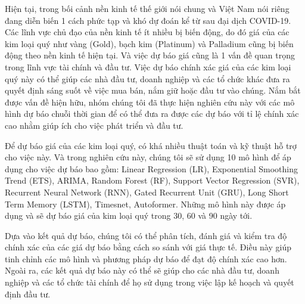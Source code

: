 Hiện tại, trong bối cảnh nền kinh tế thế giới nói chung và Việt Nam nói riêng đang diễn biến 1 cách phức tạp và khó dự đoán kể từ sau đại dịch COVID-19. Các lĩnh vực chủ đạo của nền kinh tế ít nhiều bị biến động, do đó giá của các kim loại quý như vàng (Gold), bạch kim (Platinum) và Palladium cũng bị biến động theo nền kinh tế hiện tại. Và việc dự báo giá cũng là 1 vấn đề quan trọng trong lĩnh vực tài chính và đầu tư. Việc dự báo chính xác giá của các kim loại quý này có thể giúp các nhà đầu tư, doanh nghiệp và các tổ chức khác đưa ra quyết định sáng suốt về việc mua bán, nắm giữ hoặc đầu tư vào chúng. Nắm bắt được vấn đề hiện hữu, nhóm chúng tôi đã thực hiện nghiên cứu này với các mô hình dự báo chuỗi thời gian để có thể đưa ra được các dự báo với tỉ lệ chính xác cao nhằm giúp ích cho việc phát triển và đầu tư.

Để dự báo giá của các kim loại quý, có khá nhiều thuật toán và kỹ thuật hỗ trợ cho việc này. Và trong nghiên cứu này, chúng tôi sẽ sử dụng 10 mô hình để áp dụng cho việc dự báo bao gồm: Linear Regression (LR), Exponential Smoothing Trend (ETS), ARIMA, Random Forest (RF), Support Vector Regression (SVR), Recurrent Neural Network (RNN), Gated Recurrent Unit  (GRU), Long Short Term Memory (LSTM), Timesnet, Autoformer. Những mô hình này được áp dụng và sẽ dự báo giá của kim loại quý trong 30, 60 và 90 ngày tới.

Dựa vào kết quả dự báo, chúng tôi có thể phân tích, đánh giá và kiểm tra độ chính xác của các giá dự báo bằng cách so sánh với giá thực tế. Điều này giúp tinh chỉnh các mô hình và phương pháp dự báo để đạt độ chính xác cao hơn. Ngoài ra, các kết quả dự báo này có thể sẽ giúp cho các nhà đầu tư, doanh nghiệp và các tổ chức tài chính để họ sử dụng trong việc lập kế hoạch và quyết định đầu tư.